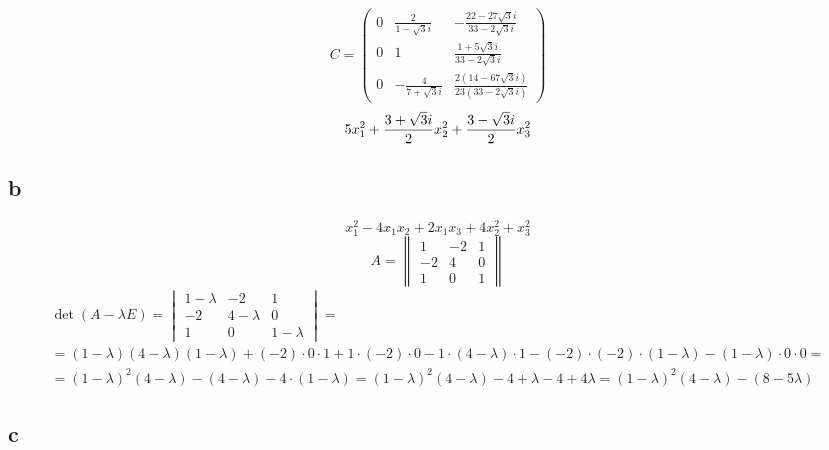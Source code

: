 $$ C =
\begin{pmatrix}
    0 & \frac2{1 - \sqrt3i} & -\frac{22 - 27\sqrt3i}{33 - 2\sqrt3i} \\
    0 & 1 & \frac{1 + 5\sqrt3i}{33 - 2\sqrt3i} \\
    0 & -\frac4{7 + \sqrt3i} & \frac{2(14 - 67\sqrt3i)}{23(33 - 2\sqrt3i)}
\end{pmatrix} $$
$$ 5x_1^2 + \half[3 + \sqrt3i]x_2^2 + \half[3 - \sqrt3i]x_3^2 $$

\subsection{b}

$$ x_1^2 - 4x_1x_2 + 2x_1x_3 + 4x_2^2 + x_3^2 $$
$$ A =
\begin{Vmatrix}
	1 & -2 & 1 \\
    -2 & 4 & 0 \\
    1 & 0 & 1
\end{Vmatrix} $$
\begin{multline*}
    \det(A - \lambda E) =
    \begin{vmatrix}
        1 - \lambda & -2 & 1 \\
        -2 & 4 - \lambda & 0 \\
        1 & 0 & 1 - \lambda
    \end{vmatrix} = \\
    = (1 - \lambda)(4 - \lambda)(1 - \lambda) + (-2) \cdot 0 \cdot 1 + 1 \cdot (-2) \cdot 0 - 1 \cdot (4 - \lambda) \cdot 1 - (-2) \cdot (-2) \cdot (1 - \lambda) - (1 - \lambda) \cdot 0 \cdot 0 = \\
    = (1 - \lambda)^2 (4 - \lambda) - (4 - \lambda) - 4 \cdot (1 - \lambda) = (1 - \lambda)^2 (4 - \lambda) - 4 + \lambda - 4 + 4 \lambda = (1 - \lambda)^2 (4 - \lambda) - (8 - 5 \lambda)
\end{multline*}

\subsection{c}

